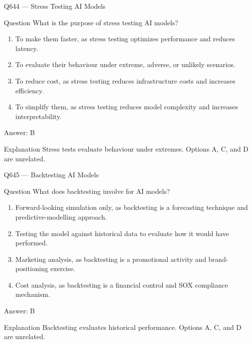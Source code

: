 \documentclass[aspectratio=169,8pt]{beamer}
\begin{document}
	\begin{frame}{Q644 --- Stress Testing AI Models}
		\begin{block}{Question}
			What is the purpose of stress testing AI models?
			\begin{enumerate}
				\item To make them faster, as stress testing optimizes performance and reduces latency.
				\item To evaluate their behaviour under extreme, adverse, or unlikely scenarios.
				\item To reduce cost, as stress testing reduces infrastructure costs and increases efficiency.
				\item To simplify them, as stress testing reduces model complexity and increases interpretability.
			\end{enumerate}
		\end{block}
		\begin{exampleblock}{Answer: B}\end{exampleblock}
		\begin{block}{Explanation}
			Stress tests evaluate behaviour under extremes. Options A, C, and D are unrelated.
		\end{block}
	\end{frame}
	
	\begin{frame}{Q645 --- Backtesting AI Models}
		\begin{block}{Question}
			What does backtesting involve for AI models?
			\begin{enumerate}
				\item Forward-looking simulation only, as backtesting is a forecasting technique and predictive-modelling approach.
				\item Testing the model against historical data to evaluate how it would have performed.
				\item Marketing analysis, as backtesting is a promotional activity and brand-positioning exercise.
				\item Cost analysis, as backtesting is a financial control and SOX compliance mechanism.
			\end{enumerate}
		\end{block}
		\begin{exampleblock}{Answer: B}\end{exampleblock}
		\begin{block}{Explanation}
			Backtesting evaluates historical performance. Options A, C, and D are unrelated.
		\end{block}
	\end{frame}
	
\end{document}
